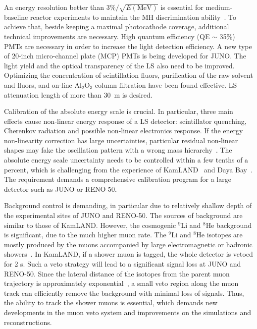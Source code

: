 \documentclass[aps,twocolumn,preprintnumbers,amsmath,superscriptaddress,amssymb,floats,nofootinbib]{revtex4-1}
\begin{document}
An energy resolution better than $3\%/\sqrt{E(\textrm{MeV})}$ is essential for medium-baseline reactor experiments to maintain the MH discrimination ability~\cite{Li-PRD13}. 
To achieve that, beside keeping a maximal photocathode coverage, additional technical improvements are necessary.
High quantum efficiency (QE $\sim$ 35\%) PMTs are necessary in order to increase the light detection efficiency. A new type of 20-inch micro-channel plate (MCP) PMTs is being developed for JUNO. The light yield and the optical transparency of the LS also need to be improved. Optimizing the concentration of scintillation fluors, purification of the raw solvent and fluors, and on-line Al$_2$O$_3$ column filtration have been found effective. LS attenuation length of more than 30~m is desired.

Calibration of the absolute energy scale is crucial. 
In particular, three main effects cause non-linear energy response of a LS detector: scintillator quenching, Cherenkov radiation and possible non-linear electronics response. 
If the energy non-linearity correction has large uncertainties, particular residual non-linear shapes may fake the oscillation pattern with a wrong mass hierarchy~\cite{Qian-PRD13}. 
The absolute energy scale uncertainty needs to be controlled within a few tenths of a percent, which is challenging from the experience of KamLAND~\cite{KamLAND-4pi} and Daya Bay~\cite{Zhang-Neutrino14}. The requirement demands a comprehensive calibration program for a large detector such as JUNO or RENO-50.

Background control is demanding, in particular due to relatively shallow depth of the experimental sites of JUNO and RENO-50. 
The sources of background are similar to those of KamLAND. 
However, the cosmogenic $^9$Li and $^8$He background is significant, due to the much higher muon rate. 
The $^9$Li and $^8$He isotopes are mostly produced by the muons accompanied by large electromagnetic or hadronic showers~\cite{KamLAND-spall}. In KamLAND, if a shower muon is tagged, the whole detector is vetoed for 2 s. Such a veto strategy will lead to a significant signal loss at JUNO and RENO-50. 
Since the lateral distance of the isotopes from the parent muon trajectory is approximately exponential~\cite{KamLAND-spall}, a small veto region along the muon track can efficiently remove the background with minimal loss of signals. Thus, the ability to track the shower muons is essential, which demands new developments in the muon veto system and improvements on the simulations and reconstructions.
\end{document}
